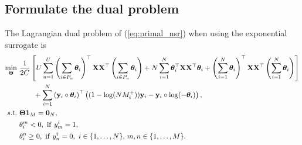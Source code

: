 \subsection{Formulate the dual problem}
The Lagrangian dual problem of (\ref{eq:primal_nsr}) when using the exponential surrogate is
\begin{equation}
\label{eq:dual_nsr}
\begin{aligned}
\min_{\Thetabm} \ & \frac{1}{2 C} \left[
     U \sum_{u=1}^U \left( \sum_{i \in P_u} \thetabm_i \right)^\top \X \X^\top \left( \sum_{i \in P_u} \thetabm_i \right)
   + N \sum_{i=1}^N \thetabm_i^\top \X \X^\top \thetabm_i
   + \left( \sum_{i=1}^N \thetabm_i \right)^\top \X \X^\top \left( \sum_{i=1}^N \thetabm_i \right) \right] \\
& \hspace{2em}
   + \sum_{i=1}^N \left( \y_i \circ \thetabm_i \right)^\top \left( (1 - \log(N M_i^+)) \y_i - \y_i \circ \log(-\thetabm_i) \right), \\
s.t. \ 
& \Thetabm \one_M = \zero_N, \\
& \theta_i^m < 0, \ \mathrm{if} \ y_m^i = 1, \\
& \theta_i^n \ge 0, \ \mathrm{if} \ y_n^i = 0, \ i \in \{1,\dots,N\}, \, m,n \in \{1,\dots,M\}.
\end{aligned}
\end{equation}
